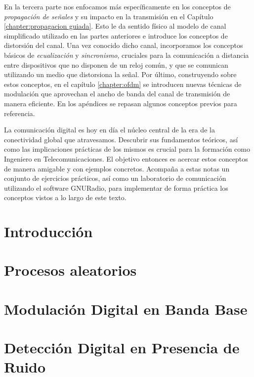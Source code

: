 \documentclass[a4paper,11pt]{report}
\theoremstyle{definition}
\begin{document}
En la tercera parte nos enfocamos más específicamente en los conceptos de \emph{propagación de señales} y su impacto en la transmisión en el Capítulo \ref{chapter:propagacion guiada}. Esto le da sentido físico al modelo de canal simplificado utilizado en las partes anteriores e introduce los conceptos de distorsión del canal. Una vez conocido dicho canal, incorporamos los conceptos básicos de \emph{ecualización} y \emph{sincronismo}, cruciales para la comunicación a distancia entre dispositivos que no disponen de un reloj común, y que se comunican utilizando un medio que distorsiona la señal. Por último, construyendo sobre estos conceptos, en el capítulo \ref{chapter:ofdm} se introducen nuevas técnicas de modulación que aprovechan el ancho de banda del canal de transmisión de manera eficiente. En los apéndices se repasan algunos conceptos previos para referencia.

La comunicación digital es hoy en día el núcleo central de la era de la conectividad global que atravesamos. Descubrir sus fundamentos teóricos, así como las implicaciones prácticas de los mismos es crucial para la formación como Ingeniero en Telecomunicaciones. El objetivo entonces es acercar estos conceptos de manera amigable y con ejemplos concretos. Acompaña a estas notas un conjunto de ejercicios prácticos, así como un laboratorio de comunicación utilizando el software GNURadio, para implementar de forma práctica los conceptos vistos a lo largo de este texto.

\tableofcontents


\chapter{Introducción}\label{chapter:introduccion}


\chapter{Procesos aleatorios}\label{chapter:procesos estocasticos}


\chapter{Modulación Digital en Banda Base}\label{chapter:modulacion banda base}


\chapter{Detección Digital en Presencia de Ruido}\label{chapter:deteccion ruido}

\end{document}
